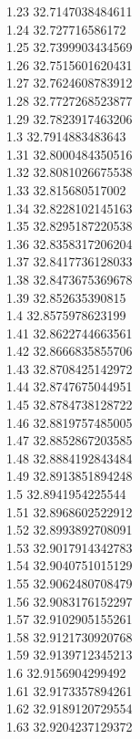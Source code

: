 {1.23	32.7147038484611\\
1.24	32.727716586172\\
1.25	32.7399903434569\\
1.26	32.7515601620431\\
1.27	32.7624608783912\\
1.28	32.7727268523877\\
1.29	32.7823917463206\\
1.3	32.7914883483643\\
1.31	32.8000484350516\\
1.32	32.8081026675538\\
1.33	32.815680517002\\
1.34	32.8228102145163\\
1.35	32.8295187220538\\
1.36	32.8358317206204\\
1.37	32.8417736128033\\
1.38	32.8473675369678\\
1.39	32.852635390815\\
1.4	32.8575978623199\\
1.41	32.8622744663561\\
1.42	32.8666835855706\\
1.43	32.8708425142972\\
1.44	32.8747675044951\\
1.45	32.8784738128722\\
1.46	32.8819757485005\\
1.47	32.8852867203585\\
1.48	32.8884192843484\\
1.49	32.8913851894248\\
1.5	32.8941954225544\\
1.51	32.8968602522912\\
1.52	32.8993892708091\\
1.53	32.9017914342783\\
1.54	32.9040751015129\\
1.55	32.9062480708479\\
1.56	32.9083176152297\\
1.57	32.9102905155261\\
1.58	32.9121730920768\\
1.59	32.9139712345213\\
1.6	32.9156904299492\\
1.61	32.9173357894261\\
1.62	32.9189120729554\\
1.63	32.9204237129372\\
}
